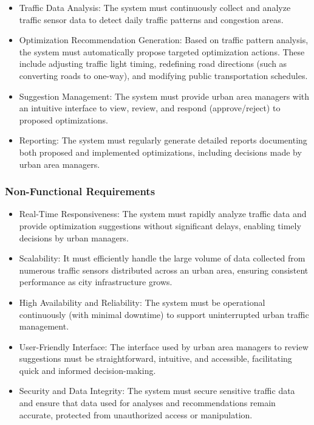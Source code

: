 \documentclass[a4paper,12pt]{article}
\begin{document}
\begin{itemize}
    
\item Traffic Data Analysis:
The system must continuously collect and analyze traffic sensor data to detect daily traffic patterns and congestion areas.

\item Optimization Recommendation Generation:
Based on traffic pattern analysis, the system must automatically propose targeted optimization actions. These include adjusting traffic light timing, redefining road directions (such as converting roads to one-way), and modifying public transportation schedules.

\item Suggestion Management:
The system must provide urban area managers with an intuitive interface to view, review, and respond (approve/reject) to proposed optimizations.

\item Reporting:
The system must regularly generate detailed reports documenting both proposed and implemented optimizations, including decisions made by urban area managers.

\end{itemize}

\subsubsection{Non-Functional Requirements}
\begin{itemize}
These constraints or conditions influence how the system performs its functions:

\item Real-Time Responsiveness:
The system must rapidly analyze traffic data and provide optimization suggestions without significant delays, enabling timely decisions by urban managers.

\item Scalability:
It must efficiently handle the large volume of data collected from numerous traffic sensors distributed across an urban area, ensuring consistent performance as city infrastructure grows.

\item High Availability and Reliability:
The system must be operational continuously (with minimal downtime) to support uninterrupted urban traffic management.

\item User-Friendly Interface:
The interface used by urban area managers to review suggestions must be straightforward, intuitive, and accessible, facilitating quick and informed decision-making.

\item Security and Data Integrity:
The system must secure sensitive traffic data and ensure that data used for analyses and recommendations remain accurate, protected from unauthorized access or manipulation.
    
\end{itemize}
\end{document}
